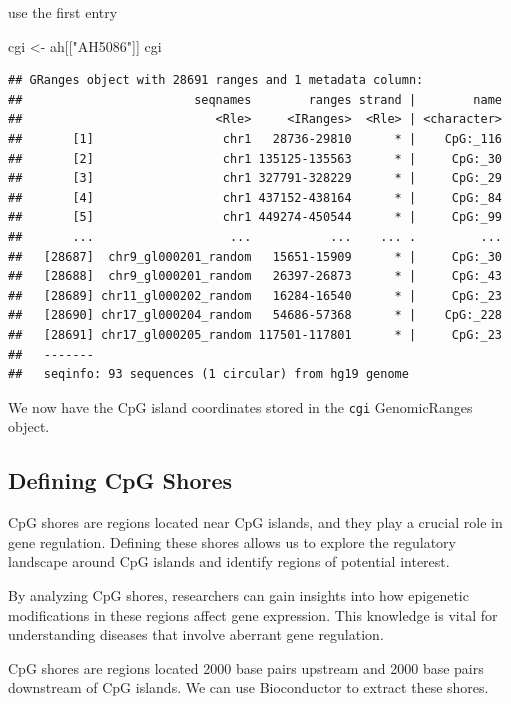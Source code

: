 \documentclass[
]{book}
\newenvironment{Shaded}{\begin{snugshade}}{\end{snugshade}}
\newcommand{\NormalTok}[1]{#1}
\newcommand{\OtherTok}[1]{\textcolor[rgb]{0.56,0.35,0.01}{#1}}
\newcommand{\StringTok}[1]{\textcolor[rgb]{0.31,0.60,0.02}{#1}}
\begin{document}
use the first entry

\begin{Shaded}
\begin{Highlighting}[]
\NormalTok{cgi }\OtherTok{\textless{}{-}}\NormalTok{ ah[[}\StringTok{"AH5086"}\NormalTok{]]}
\NormalTok{cgi}
\end{Highlighting}
\end{Shaded}

\begin{verbatim}
## GRanges object with 28691 ranges and 1 metadata column:
##                        seqnames        ranges strand |        name
##                           <Rle>     <IRanges>  <Rle> | <character>
##       [1]                  chr1   28736-29810      * |    CpG:_116
##       [2]                  chr1 135125-135563      * |     CpG:_30
##       [3]                  chr1 327791-328229      * |     CpG:_29
##       [4]                  chr1 437152-438164      * |     CpG:_84
##       [5]                  chr1 449274-450544      * |     CpG:_99
##       ...                   ...           ...    ... .         ...
##   [28687]  chr9_gl000201_random   15651-15909      * |     CpG:_30
##   [28688]  chr9_gl000201_random   26397-26873      * |     CpG:_43
##   [28689] chr11_gl000202_random   16284-16540      * |     CpG:_23
##   [28690] chr17_gl000204_random   54686-57368      * |    CpG:_228
##   [28691] chr17_gl000205_random 117501-117801      * |     CpG:_23
##   -------
##   seqinfo: 93 sequences (1 circular) from hg19 genome
\end{verbatim}

We now have the CpG island coordinates stored in the \texttt{cgi} GenomicRanges object.

\hypertarget{defining-cpg-shores}{%
\subsection{Defining CpG Shores}\label{defining-cpg-shores}}

CpG shores are regions located near CpG islands, and they play a crucial role in gene regulation. Defining these shores allows us to explore the regulatory landscape around CpG islands and identify regions of potential interest.

By analyzing CpG shores, researchers can gain insights into how epigenetic modifications in these regions affect gene expression. This knowledge is vital for understanding diseases that involve aberrant gene regulation.

CpG shores are regions located 2000 base pairs upstream and 2000 base pairs downstream of CpG islands. We can use Bioconductor to extract these shores.
\end{document}
